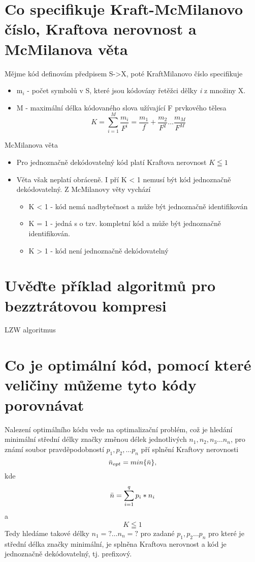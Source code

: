 \section{Co specifikuje Kraft-McMilanovo číslo, Kraftova nerovnost a McMilanova věta}
Mějme kód definovám předpisem S->X, poté KraftMilanovo číslo specifikuje
\begin{itemize}
    \item m$_i$ - počet symbolů v S, které jsou kódovány řetěžci dělky \emph{i} z množiny X.
    \item M - maximální délka kódovaného slova užívající F prvkového tělesa
    $$K = \sum_{i=1}^M \frac{m_i}{F^i}= \frac{m_1}{f} + \frac{m_2}{F^2} \dots \frac{m_M}{F^M}$$
\end{itemize}
McMilanova věta
\begin{itemize}
    \item Pro jednoznačně dekódovatelný kód platí Kraftova nerovnost $K \leqq 1$
    \item Věta však neplatí obráceně.
    I pří K < 1 nemusí být kód jednoznačně dekódovatelný.
    Z McMilanovy věty vychází
    \begin{itemize}
        \item K < 1 - kód nemá nadbytečnost a může být jednoznačně identifikován
        \item K = 1 - jedná s o tzv. kompletní kód a může být jednoznačně identifikován.
        \item K > 1 - kód není jednoznačně dekódovatelný
    \end{itemize}
\end{itemize}
\section{Uvěďte příklad algoritmů pro bezztrátovou kompresi}
LZW algoritmus

\section{Co je optimální kód, pomocí které veličiny můžeme tyto kódy porovnávat}
Nalezení optimálního kódu vede  na optimalizační problém, což je hledání minimální střední délky značky změnou délek jednotlivých $n_1, n_2, n_3 \dots n_n$, pro známí soubor pravděpodobností $p_1, p_2, \dots p_n$ pří splnění Kraftovy nerovnosti
$$\Bar{n}_{opt} = min \{\Bar{n}\},$$ kde
$$\Bar{n}=\sum_{i=1}^q p_i*n_i$$ a 
$$K\leqq1$$
Tedy hledáme takové délky $n_1=? \dots n_n=?$ pro zadané $p_1,p_2\dots p_n$ pro které je střední délka značky minimální, je splněna Kraftova nerovnost a kód je jednoznačně dekódovatelný, tj. prefixový.

